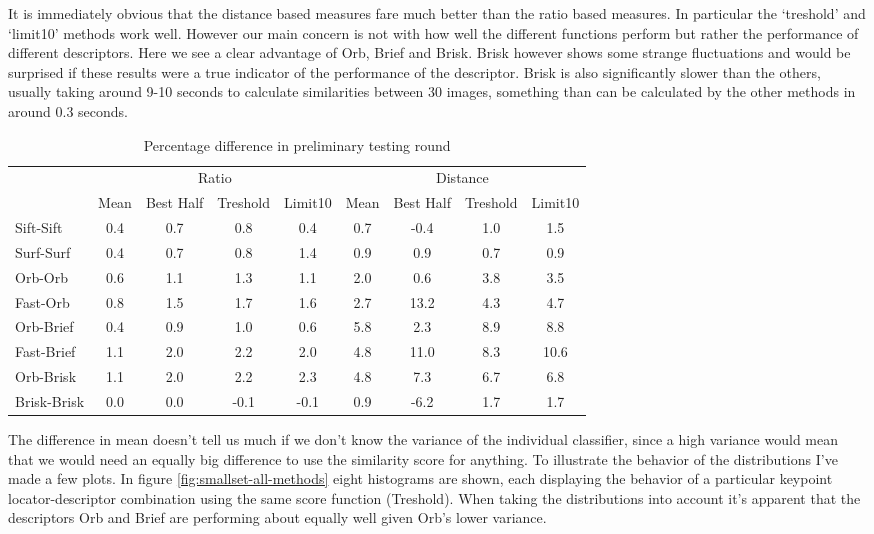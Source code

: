 \documentclass{article}
\begin{document}
It is immediately obvious that the distance based measures fare much better 
than the ratio based measures. In particular the `treshold' and `limit10' 
methods work well. However our main concern is not with how well the different 
functions perform but rather the performance of different descriptors. Here we 
see a clear advantage of Orb, Brief and Brisk. Brisk however shows some strange 
fluctuations and would be surprised if these results were a true indicator of 
the performance of the descriptor. Brisk is also significantly slower than the 
others, usually taking around 9-10 seconds to calculate similarities between 30 
images, something than can be calculated by the other methods in around 0.3 
seconds.

\begin{table}[t]
\begin{adjustbox}{center}
	\label{table:preliminary}
	\begin{tabular}{l c c c c c c c c}
		& \multicolumn{4}{c}{Ratio} & \multicolumn{4}{c}{Distance} \\
		& Mean & Best Half & Treshold & Limit10 & Mean & Best Half & Treshold &
Limit10 \\
		\hline
		Sift-Sift	& 0.4 & 0.7 & 0.8  & 0.4  & 0.7 & -0.4 & 1.0 & 1.5 \\
		Surf-Surf	& 0.4 & 0.7 & 0.8  & 1.4  & 0.9 & 0.9  & 0.7 & 0.9 \\
		Orb-Orb		& 0.6 & 1.1 & 1.3  & 1.1  & 2.0 & 0.6  & 3.8 & 3.5 \\
		Fast-Orb	& 0.8 & 1.5 & 1.7  & 1.6  & 2.7 & 13.2 & 4.3 & 4.7 \\
		Orb-Brief	& 0.4 & 0.9 & 1.0  & 0.6  & 5.8 & 2.3  & 8.9 & 8.8 \\
		Fast-Brief	& 1.1 & 2.0 & 2.2  & 2.0  & 4.8 & 11.0 & 8.3 & 10.6 \\
		Orb-Brisk	& 1.1 & 2.0 & 2.2  & 2.3  & 4.8 & 7.3  & 6.7 & 6.8 \\
		Brisk-Brisk	& 0.0 & 0.0 & -0.1 & -0.1 & 0.9 & -6.2 & 1.7 & 1.7 \\
	\end{tabular}
\end{adjustbox}
	\caption{Percentage difference in preliminary testing round}
\end{table}

The difference in mean doesn't tell us much if we don't know the variance of 
the individual classifier, since a high variance would mean that we would need 
an equally big difference to use the similarity score for anything. To 
illustrate the behavior of the distributions I've made a few plots. In 
figure \ref{fig:smallset-all-methods} eight histograms are shown, each 
displaying the behavior of a particular keypoint locator-descriptor 
combination using the same score function (Treshold).  When taking the 
distributions into account it's apparent that the descriptors Orb and 
Brief are performing about equally well given Orb's lower variance.
\end{document}
